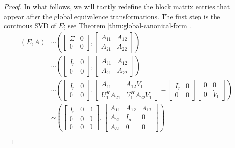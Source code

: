 \documentclass[]{book}
\theoremstyle{definition}
\theoremstyle{definition}
\theoremstyle{definition}
\theoremstyle{remark}
\begin{document}
\begin{proof}
{}In what follows, we will tacitly redefine the block matrix entries that appear after the global equivalence transformations. The first step is the continous SVD of \(E\); see Theorem \ref{thm:global-canonical-form}.
\begin{align*}
(E,A) & 
\sim   
\left(\begin{bmatrix}
\Sigma & 0 \\
0 & 0
\end{bmatrix},
\begin{bmatrix}
A_{11} & A_{12} \\
A_{21} & A_{22}
\end{bmatrix}\right) \\
& \sim   
\left(\begin{bmatrix}
I_r & 0 \\
0 & 0
\end{bmatrix},
\begin{bmatrix}
A_{11} & A_{12} \\
A_{21} & A_{22}
\end{bmatrix}\right) \\
& \sim   
\left(\begin{bmatrix}
I_r & 0 \\
0 & 0
\end{bmatrix},
\begin{bmatrix}
A_{11} & A_{12}V_1 \\
U_1^HA_{21} & U_1^HA_{22}V_1 
\end{bmatrix}
-
\begin{bmatrix} I_r & 0 \\ 0 & 0 \end{bmatrix}
\begin{bmatrix} 0 & 0 \\ 0 & \dot V_1 \end{bmatrix}
\right) \\
& \sim   
\left(\begin{bmatrix}
I_r & 0 & 0 \\
0 & 0 & 0 \\
0 & 0 & 0
\end{bmatrix},
\begin{bmatrix}
A_{11} & A_{12} & A_{13}\\
A_{21} & I_a & 0 \\
A_{31} & 0  & 0
\end{bmatrix}\right) \\

\end{align*}
\end{proof}
\end{document}
